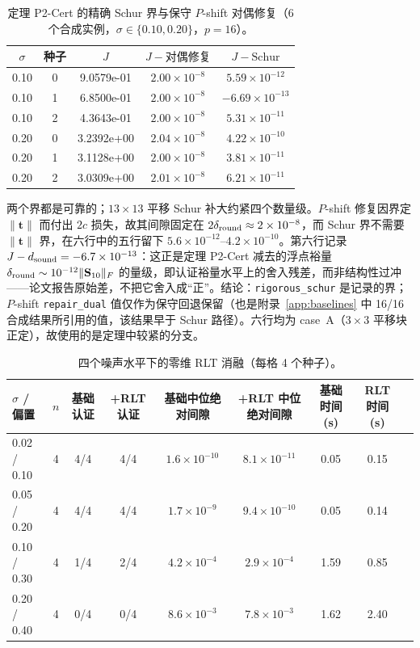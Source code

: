 \begin{table}[t]
\centering
\caption{定理 P2-Cert 的精确 Schur 界与保守 $P$-shift 对偶修复（6 个合成实例，$\sigma\in\{0.10,0.20\}$，$p=16$）。}
\label{tab:app_schur}
\scriptsize
\setlength{\tabcolsep}{3pt}
\begin{tabular}{@{}ccccc@{}}
\toprule
$\sigma$ & 种子 & $J$ & $J-\text{对偶修复}$ & $J-\text{Schur}$ \\
\midrule
0.10 & 0 & 9.0579e-01 & $2.00\times10^{-8}$ & $5.59\times10^{-12}$ \\
0.10 & 1 & 6.8500e-01 & $2.00\times10^{-8}$ & $-6.69\times10^{-13}$ \\
0.10 & 2 & 4.3643e-01 & $2.00\times10^{-8}$ & $5.31\times10^{-11}$ \\
0.20 & 0 & 3.2392e+00 & $2.04\times10^{-8}$ & $4.22\times10^{-10}$ \\
0.20 & 1 & 3.1128e+00 & $2.00\times10^{-8}$ & $3.81\times10^{-11}$ \\
0.20 & 2 & 3.0309e+00 & $2.01\times10^{-8}$ & $6.21\times10^{-11}$ \\
\bottomrule
\end{tabular}

\end{table}

两个界都是可靠的；$13\times13$ 平移 Schur 补大约紧四个数量级。$P$-shift 修复因界定 $\|\mathbf t\|$ 而付出 $2c$ 损失，故其间隙固定在 $2\delta_{\rm round}\approx2\times10^{-8}$，而 Schur 界不需要 $\|\mathbf t\|$ 界，在六行中的五行留下 $5.6\times10^{-12}$--$4.2\times10^{-10}$。第六行记录 $J-d_{\rm sound}=-6.7\times10^{-13}$：这正是定理 P2-Cert 减去的浮点裕量 $\delta_{\rm round}\sim10^{-12}\|\mathbf S_{10}\|_F$ 的量级，即认证裕量水平上的舍入残差，而非结构性过冲——论文报告原始差，不把它舍入成“正”。结论：\texttt{rigorous\_schur} 是记录的界；$P$-shift \texttt{repair\_dual} 值仅作为保守回退保留（也是附录~\ref{app:baselines} 中 16/16 合成结果所引用的值，该结果早于 Schur 路径）。六行均为 case~A（$3\times3$ 平移块正定），故使用的是定理中较紧的分支。

\begin{table}[t]
\centering
\caption{四个噪声水平下的零维 RLT 消融（每格 4 个种子）。}
\label{tab:app_rlt}
\scriptsize
\setlength{\tabcolsep}{2pt}
\begin{tabular}{@{}lcccccccc@{}}
\toprule
$\sigma$ / 偏置 & $n$ & 基础认证 & +RLT 认证 & 基础中位绝对间隙 & +RLT 中位绝对间隙 & 基础时间 (s) & RLT 时间 (s) \\
\midrule
0.02 / 0.10 & 4 & 4/4 & 4/4 & $1.6\times10^{-10}$ & $8.1\times10^{-11}$ & 0.05 & 0.15 \\
0.05 / 0.20 & 4 & 4/4 & 4/4 & $1.7\times10^{-9}$ & $9.4\times10^{-10}$ & 0.05 & 0.14 \\
0.10 / 0.30 & 4 & 1/4 & 2/4 & $4.2\times10^{-4}$ & $2.9\times10^{-4}$ & 1.59 & 0.85 \\
0.20 / 0.40 & 4 & 0/4 & 0/4 & $8.6\times10^{-3}$ & $7.8\times10^{-3}$ & 1.62 & 2.40 \\
\bottomrule
\end{tabular}

\end{table}

